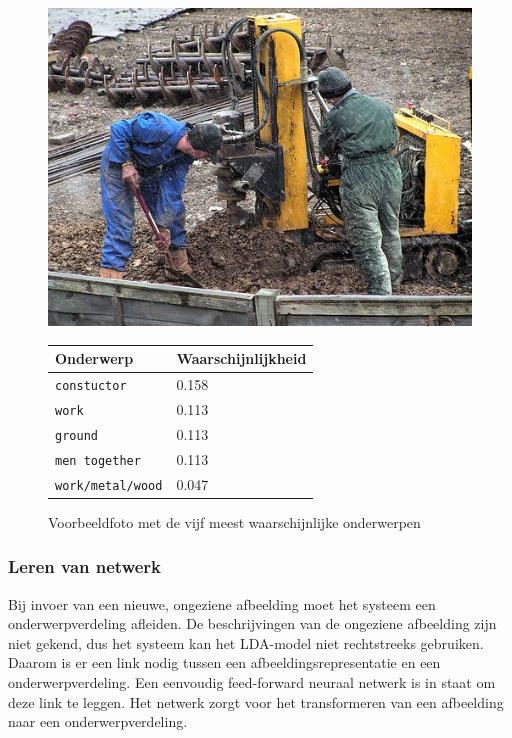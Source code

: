 \begin{figure}[h]
	\centering
	\begin{minipage}[t]{.5\linewidth}
		\centering
		\vspace{0pt}
		\includegraphics[width=\textwidth]{Images/LDA/5402085.jpg}
	\end{minipage}\hfill
	\begin{minipage}[t]{.5\textwidth}
		\centering
		\vspace{0pt}
		\begin{tabular}{ll}
			Onderwerp                           & Waarschijnlijkheid\\
			\hline
			\texttt{constuctor}             & 0.158 \\
			\texttt{work}                   & 0.113 \\
			\texttt{ground}                 & 0.113 \\
			\texttt{men together}           & 0.113 \\
			\texttt{work/metal/wood}        & 0.047\\
			\hline
		\end{tabular}
	\end{minipage}
	\caption{Voorbeeldfoto met de vijf meest waarschijnlijke onderwerpen}
	\label{fig:ldatopics}
\end{figure}

\subsubsection{Leren van netwerk}
\label{sec:LDAprediction}
Bij invoer van een nieuwe, ongeziene afbeelding moet het systeem een onderwerpverdeling afleiden. De beschrijvingen van de ongeziene afbeelding zijn niet gekend, dus het systeem kan het LDA-model niet rechtstreeks gebruiken. Daarom is er een link nodig tussen een afbeeldingsrepresentatie en een onderwerpverdeling. Een eenvoudig feed-forward neuraal netwerk is in staat om deze link te leggen. 
Het netwerk zorgt voor het transformeren van een afbeelding naar een onderwerpverdeling.

